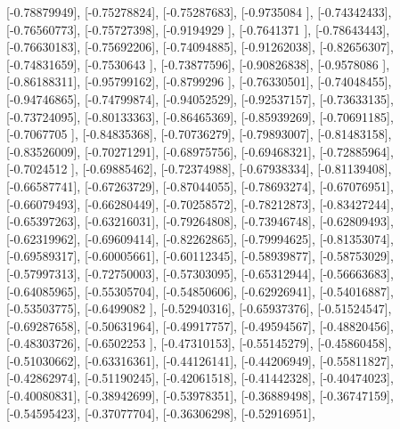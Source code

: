 \documentclass{article}
\begin{document}
       [-0.78879949],
       [-0.75278824],
       [-0.75287683],
       [-0.9735084 ],
       [-0.74342433],
       [-0.76560773],
       [-0.75727398],
       [-0.9194929 ],
       [-0.7641371 ],
       [-0.78643443],
       [-0.76630183],
       [-0.75692206],
       [-0.74094885],
       [-0.91262038],
       [-0.82656307],
       [-0.74831659],
       [-0.7530643 ],
       [-0.73877596],
       [-0.90826838],
       [-0.9578086 ],
       [-0.86188311],
       [-0.95799162],
       [-0.8799296 ],
       [-0.76330501],
       [-0.74048455],
       [-0.94746865],
       [-0.74799874],
       [-0.94052529],
       [-0.92537157],
       [-0.73633135],
       [-0.73724095],
       [-0.80133363],
       [-0.86465369],
       [-0.85939269],
       [-0.70691185],
       [-0.7067705 ],
       [-0.84835368],
       [-0.70736279],
       [-0.79893007],
       [-0.81483158],
       [-0.83526009],
       [-0.70271291],
       [-0.68975756],
       [-0.69468321],
       [-0.72885964],
       [-0.7024512 ],
       [-0.69885462],
       [-0.72374988],
       [-0.67938334],
       [-0.81139408],
       [-0.66587741],
       [-0.67263729],
       [-0.87044055],
       [-0.78693274],
       [-0.67076951],
       [-0.66079493],
       [-0.66280449],
       [-0.70258572],
       [-0.78212873],
       [-0.83427244],
       [-0.65397263],
       [-0.63216031],
       [-0.79264808],
       [-0.73946748],
       [-0.62809493],
       [-0.62319962],
       [-0.69609414],
       [-0.82262865],
       [-0.79994625],
       [-0.81353074],
       [-0.69589317],
       [-0.60005661],
       [-0.60112345],
       [-0.58939877],
       [-0.58753029],
       [-0.57997313],
       [-0.72750003],
       [-0.57303095],
       [-0.65312944],
       [-0.56663683],
       [-0.64085965],
       [-0.55305704],
       [-0.54850606],
       [-0.62926941],
       [-0.54016887],
       [-0.53503775],
       [-0.6499082 ],
       [-0.52940316],
       [-0.65937376],
       [-0.51524547],
       [-0.69287658],
       [-0.50631964],
       [-0.49917757],
       [-0.49594567],
       [-0.48820456],
       [-0.48303726],
       [-0.6502253 ],
       [-0.47310153],
       [-0.55145279],
       [-0.45860458],
       [-0.51030662],
       [-0.63316361],
       [-0.44126141],
       [-0.44206949],
       [-0.55811827],
       [-0.42862974],
       [-0.51190245],
       [-0.42061518],
       [-0.41442328],
       [-0.40474023],
       [-0.40080831],
       [-0.38942699],
       [-0.53978351],
       [-0.36889498],
       [-0.36747159],
       [-0.54595423],
       [-0.37077704],
       [-0.36306298],
       [-0.52916951],
\end{document}
